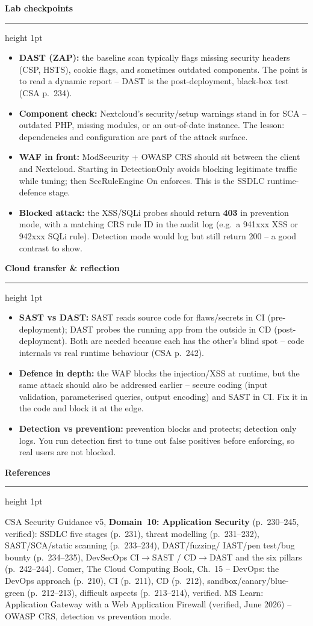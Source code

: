 \documentclass[11pt]{article}
\newcommand{\wbsection}[1]{\par\vspace{11pt}\noindent
  {\large\bfseries\color{kred}#1}\par\vspace{2pt}
  {\color{kred!35}\hrule height 1pt}\par\vspace{6pt}}
\renewcommand{\emph}[1]{\textup{#1}}
\begin{document}
\wbsection{Lab checkpoints}
\begin{itemize}
\item \textbf{DAST (ZAP):} the baseline scan typically flags missing security headers (CSP, HSTS),
      cookie flags, and sometimes outdated components. The point is to \emph{read} a dynamic report --
      DAST is the post-deployment, black-box test (CSA p.~234).
\item \textbf{Component check:} Nextcloud's security/setup warnings stand in for SCA -- outdated PHP,
      missing modules, or an out-of-date instance. The lesson: dependencies and configuration are part
      of the attack surface.
\item \textbf{WAF in front:} ModSecurity + OWASP CRS should sit between the client and Nextcloud.
      Starting in \emph{DetectionOnly} avoids blocking legitimate traffic while tuning; then
      \emph{SecRuleEngine On} enforces. This is the SSDLC runtime-defence stage.
\item \textbf{Blocked attack:} the XSS/SQLi probes should return \textbf{403} in prevention mode, with a
      matching CRS rule ID in the audit log (e.g.\ a 941xxx XSS or 942xxx SQLi rule). Detection mode
      would log but still return 200 -- a good contrast to show.
\end{itemize}

\wbsection{Cloud transfer \& reflection}
\begin{itemize}
\item \textbf{SAST vs DAST:} SAST reads source code for flaws/secrets in CI (pre-deployment); DAST
      probes the running app from the outside in CD (post-deployment). Both are needed because each has
      the other's blind spot -- code internals vs real runtime behaviour (CSA p.~242).
\item \textbf{Defence in depth:} the WAF blocks the injection/XSS at runtime, but the \emph{same} attack
      should also be addressed earlier -- secure coding (input validation, parameterised queries, output
      encoding) and SAST in CI. Fix it in the code \emph{and} block it at the edge.
\item \textbf{Detection vs prevention:} prevention blocks and protects; detection only logs. You run
      detection first to tune out false positives before enforcing, so real users are not blocked.
\end{itemize}

\wbsection{References}
CSA Security Guidance v5, \textbf{Domain~10: Application Security} (p.~230--245, verified): SSDLC five
stages (p.~231), threat modelling (p.~231--232), SAST/SCA/static scanning (p.~233--234), DAST/fuzzing/
IAST/pen test/bug bounty (p.~234--235), DevSecOps CI$\rightarrow$SAST / CD$\rightarrow$DAST and the six
pillars (p.~242--244). Comer, \emph{The Cloud Computing Book}, Ch.~15 -- DevOps: the DevOps approach
(p.~210), CI (p.~211), CD (p.~212), sandbox/canary/blue-green (p.~212--213), difficult aspects
(p.~213--214), verified. MS Learn: \emph{Application Gateway with a Web Application Firewall} (verified,
June 2026) -- OWASP CRS, detection vs prevention mode.
\end{document}
